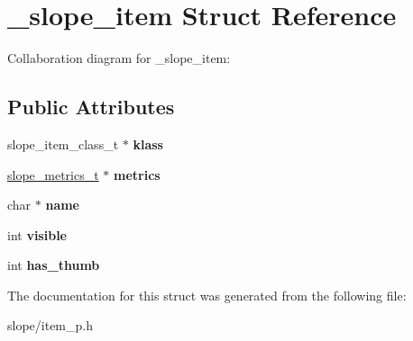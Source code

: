 \hypertarget{struct__slope__item}{\section{\+\_\+slope\+\_\+item Struct Reference}
\label{struct__slope__item}
}


Collaboration diagram for \+\_\+slope\+\_\+item\+:
\subsection*{Public Attributes}
\begin{DoxyCompactItemize}
\item 
\hypertarget{struct__slope__item_add7193a54a1fabdb37cd26d048987395}{slope\+\_\+item\+\_\+class\+\_\+t $\ast$ {\bfseries klass}}\label{struct__slope__item_add7193a54a1fabdb37cd26d048987395}

\item 
\hypertarget{struct__slope__item_ac7bdb1cdc4aaf1fd8ae234eebc1e8e13}{\hyperlink{group__Metrics_gab80787ee8ae8dc449e770249fe0e3c35}{slope\+\_\+metrics\+\_\+t} $\ast$ {\bfseries metrics}}\label{struct__slope__item_ac7bdb1cdc4aaf1fd8ae234eebc1e8e13}

\item 
\hypertarget{struct__slope__item_a3a154a02eef112186595310fd7270769}{char $\ast$ {\bfseries name}}\label{struct__slope__item_a3a154a02eef112186595310fd7270769}

\item 
\hypertarget{struct__slope__item_ac8164345fdba3cc49b58dff578718f35}{int {\bfseries visible}}\label{struct__slope__item_ac8164345fdba3cc49b58dff578718f35}

\item 
\hypertarget{struct__slope__item_a3b8509ebb99801b1140a279aa79c629f}{int {\bfseries has\+\_\+thumb}}\label{struct__slope__item_a3b8509ebb99801b1140a279aa79c629f}

\end{DoxyCompactItemize}


The documentation for this struct was generated from the following file\+:\begin{DoxyCompactItemize}
\item 
slope/item\+\_\+p.\+h\end{DoxyCompactItemize}
